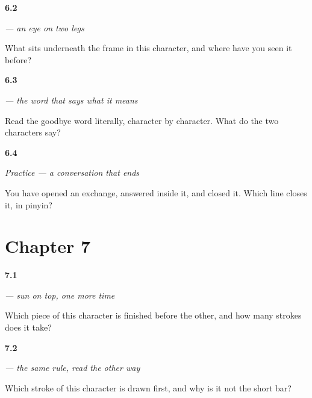 \noindent\begin{minipage}[t]{\linewidth}
\raggedright
\hypertarget{review-ZH-W06-jian-legs}{\textbf{6.2}} \emph{ — an eye on two legs}\par
\small What sits underneath the frame in this character, and where have you seen it before?
\end{minipage}\par\medskip

\noindent\begin{minipage}[t]{\linewidth}
\raggedright
\hypertarget{review-ZH-C06-zaijian-literal}{\textbf{6.3}} \emph{ — the word that says what it means}\par
\small Read the goodbye word literally, character by character. What do the two characters say?
\end{minipage}\par\medskip

\noindent\begin{minipage}[t]{\linewidth}
\raggedright
\hypertarget{review-ZH-C06-practice-close}{\textbf{6.4}} \emph{Practice — a conversation that ends}\par
\small You have opened an exchange, answered inside it, and closed it. Which line closes it, in pinyin?
\end{minipage}\par\medskip

\section*{Chapter 7}

\noindent\begin{minipage}[t]{\linewidth}
\raggedright
\hypertarget{review-ZH-W07-zao-top}{\textbf{7.1}} \emph{ — sun on top, one more time}\par
\small Which piece of this character is finished before the other, and how many strokes does it take?
\end{minipage}\par\medskip

\noindent\begin{minipage}[t]{\linewidth}
\raggedright
\hypertarget{review-ZH-W07-shang-first}{\textbf{7.2}} \emph{ — the same rule, read the other way}\par
\small Which stroke of this character is drawn first, and why is it not the short bar?
\end{minipage}\par\medskip

